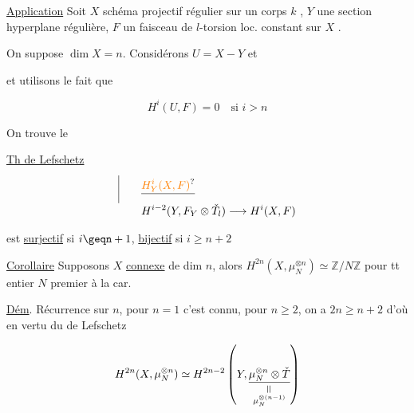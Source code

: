 
\uline{Application} \quad Soit $X$ schéma projectif régulier sur
un corps $k$ , $Y$ une section hyperplane
régulière, $F$ un faisceau de $l$-torsion loc.
constant sur $X$ .

On suppose \uline{$\dim X=n$}. Considérons $U=X-Y$ et


et utilisons le fait que

\[ H^i(U,F)=0 \quad\text{si } i>n \]

On trouve le

\uline{Th de Lefschetz}

\[
\begin{aligned}
\smash{\rule[-3ex]{.4pt}{5.8ex}}\qquad&\deleted{\unsure{H^i_Y(X,F)}}\\
&H^{i-2}(Y,F_Y\otimes\check T_l)\longrightarrow H^i(X,F)
\end{aligned}
\]

est \uline{surjectif} si $i\geqn+1$, \uline{bijectif} si $i\geq n+2$

\uline{Corollaire} \quad Supposons $X$ \uline{connexe}  de dim $n$,
\llap{\smash{\rule[-1.8ex]{.4pt}{4.2ex}}\hspace{.7em}}alors $H^{2n}(X,\mu_N^{\otimes n})\simeq\mathbb Z/N\mathbb Z$ pour tt
entier $N$ premier à la car.


\uline{Dém}. Récurrence sur $n$, pour  $n=1$
c'est connu, pour $n\geq 2$, on a 
$2n\geq n+2$ d'où en vertu du  de
Lefschetz

\[
H^{2n}(X,\mu_N^{\otimes n})\simeq H^{2n-2}
\left(Y,\underset{\substack{\rotatebox{90}{$=$}\\ \mu_N^{\otimes(n-1)}}}{\underline{\mu_N^{\otimes n}\otimes\check T}}\right)
\]

